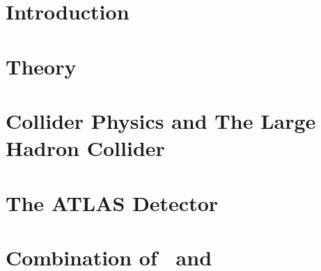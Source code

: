\documentclass[11pt]{report}
\begin{document}
\listoftables

\newpage\listoffigures



\newpage
\endofprelim

\chapter{Introduction}
\label{sec:introduction}


\chapter{Theory}
\label{sec:theory}


\chapter{Collider Physics and The Large Hadron Collider}
\label{sec:lhc}


\chapter{The ATLAS Detector}
\label{sec:atlas}




\chapter{Combination of \wwwlll~and \wwwlljj}
\label{sec:combination}




\end{document}
